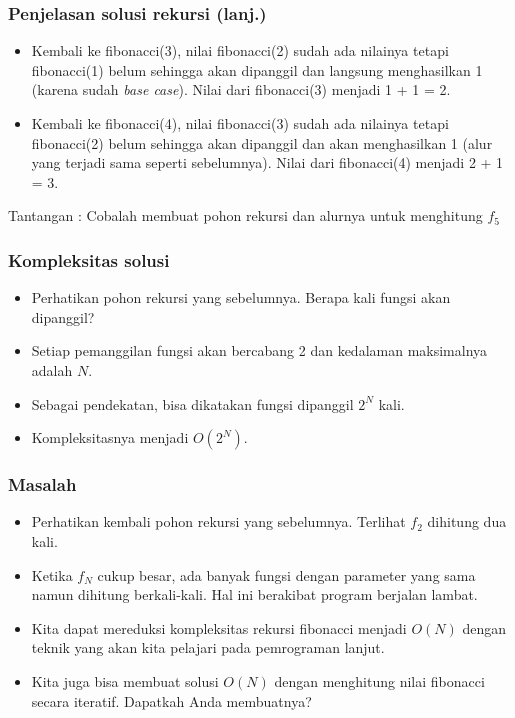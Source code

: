 \begin{frame}
\frametitle{Penjelasan solusi rekursi (lanj.)}
\begin {itemize}
  \item Kembali ke fibonacci(3), nilai fibonacci(2) sudah ada nilainya tetapi fibonacci(1) belum sehingga akan dipanggil dan langsung menghasilkan 1 (karena sudah \textit{base case}). Nilai dari fibonacci(3) menjadi 1 + 1 = 2.
  \item Kembali ke fibonacci(4), nilai fibonacci(3) sudah ada nilainya tetapi fibonacci(2) belum sehingga akan dipanggil dan akan menghasilkan 1 (alur yang terjadi sama seperti sebelumnya). Nilai dari fibonacci(4) menjadi 2 + 1 = 3.
\end{itemize}
Tantangan : Cobalah membuat pohon rekursi dan alurnya untuk menghitung $f_5$
\end{frame}

\begin{frame}
\frametitle{Kompleksitas solusi}
\begin {itemize}
   \item Perhatikan pohon rekursi yang sebelumnya. Berapa kali fungsi akan dipanggil?
   \item Setiap pemanggilan fungsi akan bercabang 2 dan kedalaman maksimalnya adalah $N$.
   \item Sebagai pendekatan, bisa dikatakan fungsi dipanggil $2^N$ kali.
   \item Kompleksitasnya menjadi $O(2^{N})$.
\end {itemize}
\end{frame}

\begin{frame}
\frametitle{Masalah}
\begin{itemize}
  \item Perhatikan kembali pohon rekursi yang sebelumnya. Terlihat $f_2$ dihitung dua kali.
  \item Ketika $f_N$ cukup besar, ada banyak fungsi dengan parameter yang sama namun dihitung berkali-kali. Hal ini berakibat program berjalan lambat.
  \item Kita dapat mereduksi kompleksitas rekursi fibonacci menjadi $O(N)$ dengan teknik yang akan kita pelajari pada pemrograman lanjut.
  \item Kita juga bisa membuat solusi $O(N)$ dengan menghitung nilai fibonacci secara iteratif. Dapatkah Anda membuatnya?
\end{itemize}
\end{frame}

